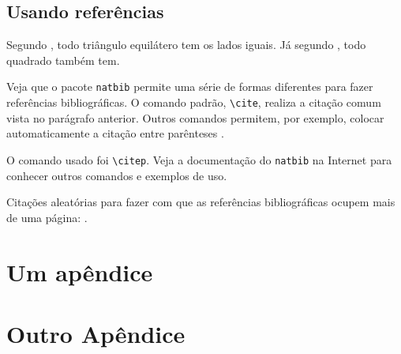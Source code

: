 \documentclass[
	phd, %
	english %
]{../ppgccufmg}
\begin{document}
		\section{Usando referências}
			Segundo \cite{horn86robot}, todo triângulo equilátero tem os lados iguais. Já segundo \cite{shashua97photometric}, todo quadrado também tem.
			
			Veja que o pacote \verb|natbib| permite uma série de formas diferentes para fazer referências bibliográficas. O comando padrão, \verb|\cite|, realiza a citação comum vista no parágrafo anterior. Outros comandos permitem, por exemplo, colocar automaticamente a citação entre	parênteses \citep{hougen93estimation, sato99illumination2, sato99illumination1, sato01stability}.
			
			O comando usado foi \verb|\citep|. Veja a documentação do \verb|natbib| na Internet para conhecer	outros comandos e exemplos de uso.
			
			Citações aleatórias para fazer com que as referências bibliográficas ocupem	mais de uma página: \cite{bichsel92simple, dror01statistics, guisser92new, dwork2006calibrating, sweeney2002k}.
			
		\renewcommand\bibname{References} %
		
		
		
		\begin{apendices}
			\chapter{Um apêndice}
				\lipsum[1-3]
				
			\chapter{Outro Apêndice}
				\lipsum[4-6]
				
		\end{apendices}
		
\end{document}
